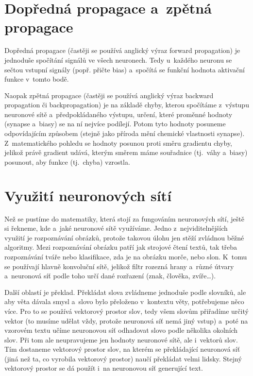\documentclass[12pt]{report}			%
\begin{document}
				\section{Dopředná propagace a~zpětná propagace}
					Dopředná propagace (častěji se používá anglický výraz forward propagation) je jednoduše spočítání signálů ve všech neuronech. Tedy u~každého neuronu se sečtou vstupní signály (popř. přičte bias) a~spočítá se funkční hodnota aktivační funkce v~tomto bodě.
					
					Naopak zpětná propagace (častěji se používá anglický výraz backward propagation či back\-propagation) je na základě chyby, kterou spočítáme z~výstupu neuronové sítě a~předpokládaného výstupu, určení, které proměnné hodnoty (\gls{synapse} a~biasy) se na ní nejvíce podílejí. Potom tyto hodnoty posuneme odpovídajícím způsobem (stejně jako příroda mění chemické vlastnosti \gls{synapse}). Z~matematického pohledu se hodnoty posunou proti směru \gls{gradient}u chyby, jelikož právě \gls{gradient} udává, kterým směrem máme souřadnice (tj.~váhy a~biasy) posunout, aby funkce (tj.~chyba) vzrostla.
					
				\section{Využití neuronových sítí}
					Než se pustíme do matematiky, která stojí za fungováním neuronových sítí, ještě si řekneme, kde a~jaké neuronové sítě využíváme. Jedno z~nejviditelnějších využití je rozpoznávání obrázků, protože takovou úlohu jen stěží zvládnou běžné algoritmy. Mezi rozpoznávání obrázku patří jak strojové čtení textů, tak třeba rozpoznávání tváře nebo klasifikace, zda je na obrázku morče, nebo slon. K~tomu se používají hlavně konvoluční sítě, jelikož filtr rozezná hrany a~různé útvary a~neuronová síť podle toho určí dané rozřazení (znak, člověka, zvíře\ldots).
					
					Další oblastí je překlad. Překládat slova zvládneme jednoduše podle slovníků, ale aby věta dávala smysl a~slovo bylo přeloženo v~kontextu věty, potřebujeme něco více. Pro to se používá vektorový prostor slov, tedy všem slovům přiřadíme určitý vektor (to musíme udělat vždy, protože neuronová síť nemá jiný vstup) a~poté na vzorovém textu učíme neuronovou síť odhadovat slovo podle několika okolních slov. Při tom ale neupravujeme jen hodnoty neuronové sítě, ale i~vektorů slov. Tím dostaneme vektorový prostor slov, na kterém se překládající neuronová síť (jiná než ta, co vyrobila vektorový prostor) naučí překládat velmi lidsky. Stejný vektorový prostor se dá použít i~na neuronovou síť generující text.
					
\end{document}
